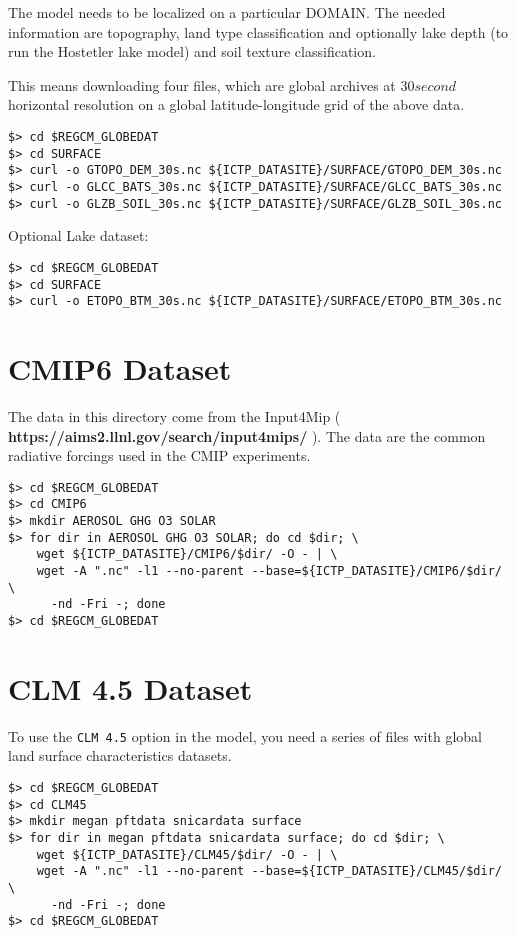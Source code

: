 The model needs to be localized on a particular DOMAIN. The needed information
are topography, land type classification and optionally lake depth (to run the
Hostetler lake model) and soil texture classification.

This means downloading four files, which are global archives at $30 second$
horizontal resolution on a global latitude-longitude grid of the above data.

\begin{Verbatim}
$> cd $REGCM_GLOBEDAT
$> cd SURFACE
$> curl -o GTOPO_DEM_30s.nc ${ICTP_DATASITE}/SURFACE/GTOPO_DEM_30s.nc
$> curl -o GLCC_BATS_30s.nc ${ICTP_DATASITE}/SURFACE/GLCC_BATS_30s.nc
$> curl -o GLZB_SOIL_30s.nc ${ICTP_DATASITE}/SURFACE/GLZB_SOIL_30s.nc
\end{Verbatim}

Optional Lake dataset:

\begin{Verbatim}
$> cd $REGCM_GLOBEDAT
$> cd SURFACE
$> curl -o ETOPO_BTM_30s.nc ${ICTP_DATASITE}/SURFACE/ETOPO_BTM_30s.nc
\end{Verbatim}

\section{CMIP6 Dataset}

The data in this directory come from the Input4Mip (
{\bf https://aims2.llnl.gov/search/input4mips/ } ). The data are the common
radiative forcings used in the CMIP experiments.

\begin{Verbatim}
$> cd $REGCM_GLOBEDAT
$> cd CMIP6
$> mkdir AEROSOL GHG O3 SOLAR
$> for dir in AEROSOL GHG O3 SOLAR; do cd $dir; \
    wget ${ICTP_DATASITE}/CMIP6/$dir/ -O - | \
    wget -A ".nc" -l1 --no-parent --base=${ICTP_DATASITE}/CMIP6/$dir/ \
      -nd -Fri -; done
$> cd $REGCM_GLOBEDAT
\end{Verbatim}

\section{CLM 4.5 Dataset}
\label{clm45data}

To use the \verb=CLM 4.5= option in the model, you need a series of files
with global land surface characteristics datasets.

\begin{Verbatim}
$> cd $REGCM_GLOBEDAT
$> cd CLM45
$> mkdir megan pftdata snicardata surface
$> for dir in megan pftdata snicardata surface; do cd $dir; \
    wget ${ICTP_DATASITE}/CLM45/$dir/ -O - | \
    wget -A ".nc" -l1 --no-parent --base=${ICTP_DATASITE}/CLM45/$dir/ \
      -nd -Fri -; done
$> cd $REGCM_GLOBEDAT
\end{Verbatim}

